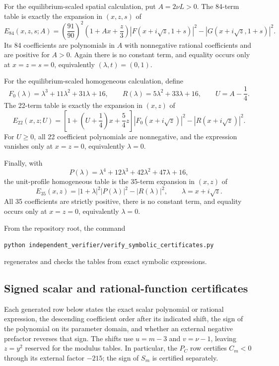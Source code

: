\documentclass[10pt]{article}
\newif\ifsiadsreview
\newcommand{\1}{\mathbf1}
\begin{document}
For the equilibrium-scaled spatial calculation, put $A=2\nu L>0$.  The
84-term table is exactly the expansion in $(x,z,s)$ of
\[
 E_{84}(x,z,s;A)=
 \left(\frac{91}{90}\right)^2
 \left(1+Ax+\frac z3\right)
 \left|F(x+i\sqrt z,1+s)\right|^2
 -\left|G(x+i\sqrt z,1+s)\right|^2.
\]
Its 84 coefficients are polynomials in $A$ with nonnegative rational
coefficients and are positive for $A>0$.  Again there is no constant term,
and equality occurs only at $x=z=s=0$, equivalently
$(\lambda,t)=(0,1)$.

For the equilibrium-scaled homogeneous calculation, define
\[
 F_0(\lambda)=\lambda^3+11\lambda^2+31\lambda+16,
 \qquad R(\lambda)=5\lambda^2+33\lambda+16,
 \qquad U=A-\frac14.
\]
The 22-term table is exactly the expansion in $(x,z)$ of
\[
 E_{22}(x,z;U)=
 \left[1+\left(U+\frac14\right)x+\frac54z\right]
 |F_0(x+i\sqrt z)|^2-|R(x+i\sqrt z)|^2.
\]
For $U\ge0$, all 22 coefficient polynomials are nonnegative, and the
expression vanishes only at $x=z=0$, equivalently $\lambda=0$.

Finally, with
\[
 P(\lambda)=\lambda^4+12\lambda^3+42\lambda^2+47\lambda+16,
\]
the unit-profile homogeneous table is the 35-term expansion in $(x,z)$ of
\[
 E_{35}(x,z)=|1+\lambda|^2|P(\lambda)|^2-|R(\lambda)|^2,
 \qquad \lambda=x+i\sqrt z.
\]
All 35 coefficients are strictly positive, there is no constant term, and
equality occurs only at $x=z=0$, equivalently $\lambda=0$.

From the repository root, the command
\ifsiadsreview
\begin{center}
\texttt{python independent\_verifier/}\\[-0.2em]
\texttt{verify\_symbolic\_certificates.py}
\end{center}
\noindent
\else
\texttt{python independent\_verifier/verify\_symbolic\_certificates.py}
\fi
regenerates and checks the tables from exact symbolic expressions.



\subsection{Signed scalar and rational-function certificates}

Each generated row below states the exact scalar polynomial or rational
expression, the descending coefficient order after its indicated shift, the
sign of the polynomial on its parameter domain, and whether an external
negative prefactor reverses that sign.  The shifts use $u=m-3$ and
$v=\nu-1$, leaving $z=y^2$ reserved for the modulus tables.  In particular,
the $P_C$ row certifies $C_m<0$ through its external factor $-215$; the sign
of $S_m$ is certified separately.
\end{document}
